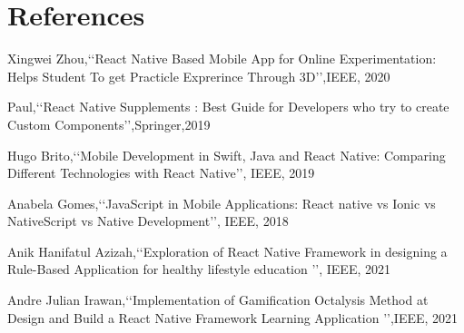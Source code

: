 \documentclass[12pt,a4paper]{report}
\begin{document}
\newpage

\appendix
\chapter{References}
\begin{enumerate}
{\item  Xingwei Zhou,\lq\lq React Native Based Mobile App for Online Experimentation: Helps Student To  get Practicle Exprerince Through 3D\rq\rq,IEEE, 2020}
{\item Paul,\lq\lq React Native Supplements : Best Guide for Developers who try to create Custom Components\rq\rq,Springer,2019}
{\item Hugo Brito,\lq\lq Mobile Development in Swift, Java and React Native: Comparing Different Technologies with React Native\rq\rq , IEEE, 2019}
{\item Anabela Gomes,\lq\lq JavaScript in Mobile Applications: React native vs Ionic vs NativeScript vs Native Development\rq\rq, IEEE, 2018}
{\item Anik Hanifatul Azizah,\lq\lq Exploration of React Native Framework in designing a Rule-Based Application for healthy lifestyle education \rq\rq, IEEE, 2021}
{\item Andre Julian Irawan,\lq\lq Implementation of Gamification Octalysis Method at Design and Build a React Native Framework Learning Application \rq\rq,IEEE, 2021}
\end{enumerate}
\end{document}
